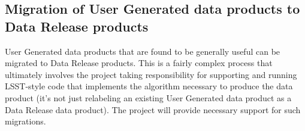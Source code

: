 \documentclass[SE,lsstdraft,toc]{lsstdoc}
\begin{document}
%
%
%
%
%
%

\subsection{Migration of User Generated data products to Data Release products}
User Generated data products that are found to be generally useful can be migrated to Data Release products.
This is a fairly complex process that ultimately involves the project taking responsibility for supporting and running LSST-style code that implements the algorithm necessary to produce the data product (it's not just relabeling an existing User Generated data product as a Data Release data product).  The project will provide necessary support for such migrations.
\end{document}
